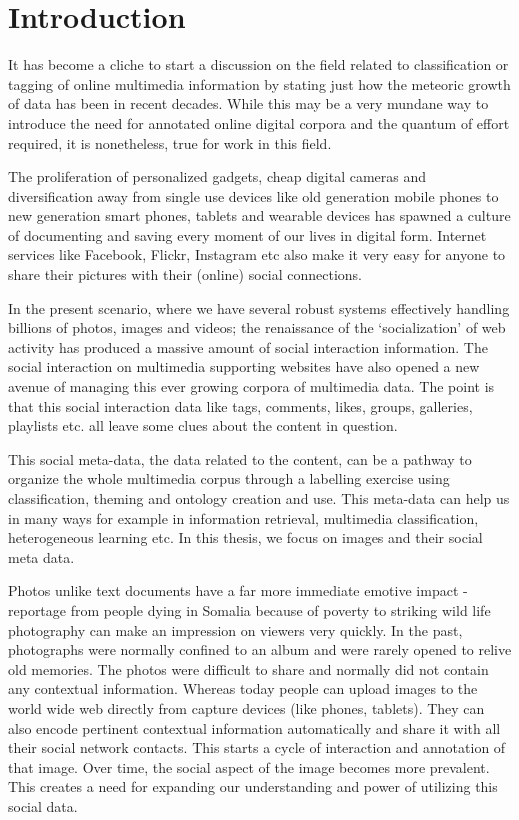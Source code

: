 \chapter{Introduction} %
\label{INTR} %
It has become a cliche to start a discussion on the field related to
classification or tagging of online multimedia information by
stating just how the meteoric growth of data has been in recent
decades. While this may be a very mundane way to introduce the need
for annotated online digital corpora and the quantum of effort
required, it is nonetheless, true for work in this field.

The proliferation of personalized gadgets, cheap digital cameras and
diversification away from single use devices like old generation mobile
phones to new generation smart phones, tablets and wearable devices has
spawned a culture of documenting and saving every moment of our lives in
digital form. Internet services like Facebook, Flickr,
Instagram etc also make it very easy for anyone to share
their pictures with their (online) social connections.

In the present scenario, where we have several robust systems
effectively handling billions of photos, images and videos; the
renaissance of the `socialization' of web activity has produced a
massive amount of social interaction information. The social
interaction on multimedia supporting websites have also opened a new
avenue of managing this ever growing corpora of multimedia data. The
point is that this social interaction data like tags, comments, likes,
groups, galleries, playlists etc. all leave some clues about the
content in question.

This social meta-data, the data related to the content, can be a
pathway to organize the whole multimedia corpus through a labelling
exercise using classification, theming and ontology creation and use.
This meta-data can help us in many ways for example in
information retrieval, multimedia classification, heterogeneous
learning etc. In this thesis, we focus on images and their social meta data.

Photos unlike text documents have a far more immediate
emotive impact - reportage from people dying in Somalia because of
poverty to striking wild life photography can make an impression on
viewers very quickly. In the past, photographs were normally confined to
an album and were rarely opened to relive old memories. The
photos were difficult to share and normally did not contain any
contextual information. Whereas today people can
upload images to the world wide web directly from capture devices
(like phones, tablets). They can also encode pertinent contextual
information automatically and share it with all their social network
contacts. This starts a cycle of interaction and annotation of that
image. Over time, the social aspect of the image becomes more
prevalent. This creates a need for expanding our understanding and
power of utilizing this social data.

